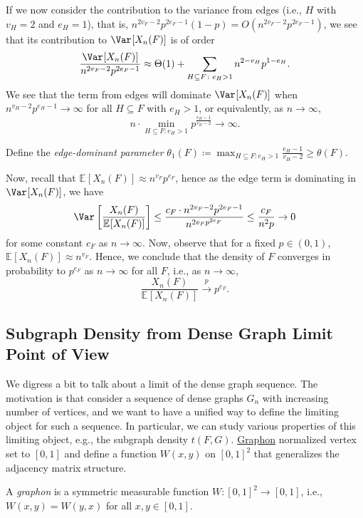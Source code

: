If we now consider the contribution to the variance from edges (i.e., \(H\) with \(v_H=2\) and \(e_H=1\)), that is, \(n^{2v_F - 2} p^{2e_F - 1} (1 - p) = O(n^{2v_F - 2} p^{2e_F - 1})\), we see that its contribution to \(\Var_{}[X_n(F)] \) is of order
\[
	\frac{\Var_{}[X_n(F)] }{n^{2v_F - 2} p^{2e_F - 1}}
	\approx \Theta (1) + \sum_{H \subseteq F\colon e_H > 1} n^{2 - v_H} p^{1 - e_H}.
\]
We see that the term from edges will dominate \(\Var_{}[X_n(F)]\) when \(n^{v_H - 2} p^{e_H - 1} \to \infty \) for all \(H \subseteq F\) with \(e_H > 1\), or equivalently, as \(n \to \infty \),
\[
	n \cdot \min _{H \subseteq F\colon e_H > 1} p^{\frac{e_H - 1}{v_H - 2}}
	\to \infty.
\]

\begin{notation}
	Define the \emph{edge-dominant parameter} \(\theta _1(F) \coloneqq \max _{H \subseteq F \colon e_H > 1} \frac{e_H - 1}{v_H - 2} \geq \theta (F)\).
\end{notation}

Now, recall that \(	\mathbb{E}_{}[X_n(F)] \approx n^{v_F} p^{e_F}\), hence as the edge term is dominating in \(\Var_{}[X_n(F)] \), we have
\[
	\Var_{}\left[\frac{X_n(F)}{\mathbb{E}_{}[X_n(F)] }\right]
	\leq \frac{c_F \cdot n^{2v_F - 2} p^{2e_F - 1}}{n^{2v_F p^{2e_F}}}
	\leq \frac{c_F}{n^{2} p}
	\to 0
\]
for some constant \(c_F\) as \(n \to \infty \). Now, observe that for a fixed \(p \in (0, 1)\), \(\mathbb{E}_{}[X_n(F)] \approx n^{v_F}\). Hence, we conclude that the density of \(F\) converges in probability to \(p^{e_F}\) as \(n \to \infty \) for all \(F\), i.e., as \(n \to \infty \),
\[
	\frac{X_n(F)}{\mathbb{E}_{}[X_n(F)]}
	\overset{p}{\to} p^{e_F}.
\]

\subsection{Subgraph Density from Dense Graph Limit Point of View}
We digress a bit to talk about a limit of the dense graph sequence. The motivation is that consider a sequence of dense graphs \(G_n\) with increasing number of vertices, and we want to have a unified way to define the limiting object for such a sequence. In particular, we can study various properties of this limiting object, e.g., the subgraph density \(t(F, G)\). \hyperref[def:graphon]{Graphon} normalized vertex set to \([0, 1]\) and define a function \(W(x, y)\) on \([0, 1]^2\) that generalizes the adjacency matrix structure.

\begin{definition}[Graphon]\label{def:graphon}
	A \emph{graphon} is a symmetric measurable function \(W \colon [0, 1]^2 \to [0, 1]\), i.e., \(W(x, y) = W(y, x)\) for all \(x, y \in [0, 1]\).
\end{definition}

